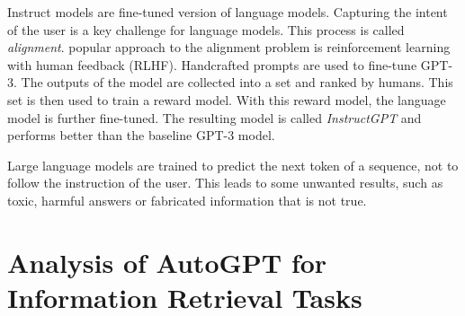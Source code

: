 \documentclass[english, version-2022-01]{uzl-thesis}
\begin{document}
Instruct models are fine-tuned version of language models. Capturing the intent of the user is a key challenge for language models. This process is called \textit{alignment}.
popular approach to the alignment problem is reinforcement learning with human feedback (RLHF). Handcrafted prompts are used to fine-tune GPT-3.
The outputs of the model are collected into a set and ranked by humans. This set is then used to train a reward model. With this reward model, the language model is further fine-tuned.
The resulting model is called \textit{InstructGPT} and performs better than the baseline GPT-3 model.

Large language models are trained to predict the next token of a sequence, not to follow the instruction of the user.
This leads to some unwanted results, such as toxic, harmful answers or fabricated information that is not true.





\chapter{Analysis of AutoGPT for Information Retrieval Tasks}

\end{document}

